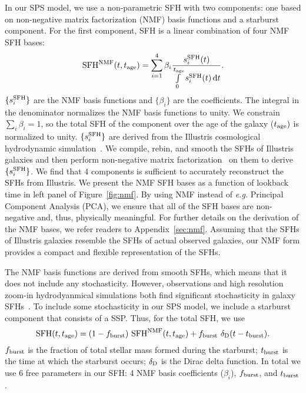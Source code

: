 In our SPS model, we use a non-parametric SFH with two components: one based on
non-negative matrix factorization (NMF) basis functions and a starburst component.
For the first component, SFH is a linear combination of four NMF SFH bases:
\begin{equation} \label{eq:nmf} 
    {\rm SFH}^{\rm NMF} (t, t_{\rm age}) = \sum\limits_{i=1}^{4} \beta_i
    \frac{s_i^{\rm SFH}(t)}{\int\limits_0^{t_{\rm age}} s_i^{\rm SFH}(t) \,
    {\rm d}t}. 
\end{equation} 
$\{s^{\rm SFH}_i\}$ are the NMF basis functions and $\{\beta_i\}$ are the
coefficients. 
The integral in the denominator normalizes the NMF basis functions to unity. 
We constrain $\sum_i \beta_i = 1$, so the total SFH of the component over the
age of the galaxy ($t_{\rm age})$ is normalized to unity.
$\{s^{\rm SFH}_i\}$ are derived from the Illustris cosmological hydrodynamic
simulation~\citep{vogelsberger2014, genel2014, nelson2015}.
We compile, rebin, and smooth the SFHs of Illustris galaxies and then perform
non-negative matrix factorization~\citep{lee1999,cichocki2009, fevotte2011} on
them to derive $\{s^{\rm SFH}_i\}$. 
We find that 4 components is sufficient to accurately reconstruct the SFHs
from Illustris. 
We present the NMF SFH bases as a function of lookback time in
left panel of Figure~\ref{fig:nmf}.
By using NMF instead of \emph{e.g.} Principal Component Analysis (PCA), we
ensure that all of the SFH bases are non-negative and, thus, physically
meaningful. 
For further details on the derivation of the NMF bases, we refer readers to
Appendix~\ref{sec:nmf}. 
Assuming that the SFHs of Illustris galaxies resemble the SFHs of actual
observed galaxies, our NMF form provides a compact and flexible representation
of the SFHs. 

The NMF basis functions are derived from smooth SFHs, which means that it does
not include any stochasticity. 
However, observations and high resolution zoom-in hydrodyanmical simulations
both find significant stochasticity in galaxy SFHs~\citep{sparre2017,
caplar2019, hahn2019b, iyer2020}. 
To include some stochasticity in our SPS model, we include a starburst
component that consists of a SSP. 
Thus, for the total SFH, we use
\begin{equation} \label{eq:sfh}
    {\rm SFH} (t, t_{\rm age}) = (1 - f_{\rm burst})~{\rm SFH}^{\rm NMF} (t,
    t_{\rm age}) + f_{\rm burst}~\delta_{\rm D}(t - t_{\rm burst}).
\end{equation}
$f_{\rm burst}$ is the fraction of total stellar mass formed during the
starburst; $t_{\rm burst}$ is the time at which the starburst occurs; 
$\delta_{\rm D}$ is the Dirac delta function.
In total we use 6 free parameters in our SFH: 4 NMF basis coefficients 
($\beta_i$), $f_{\rm burst}$, and $t_{\rm burst}$. 

